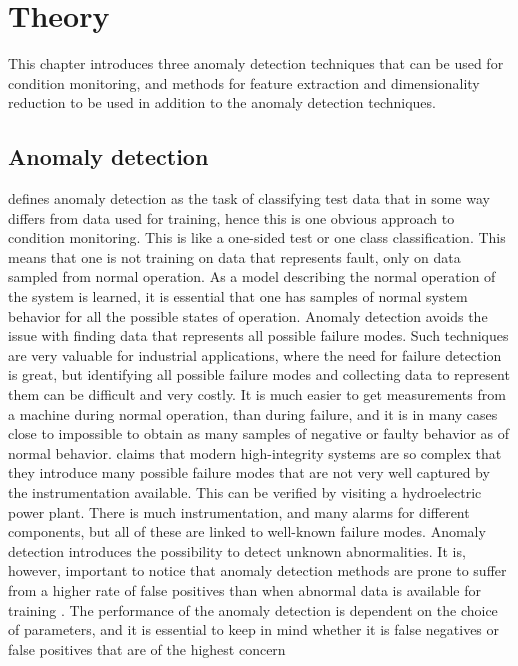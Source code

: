 \chapter{Theory}\label{cha:litterature}

This chapter introduces three anomaly detection techniques that can be used for condition monitoring, and methods for feature extraction and dimensionality reduction to be used in addition to the anomaly detection techniques. 


\section{Anomaly detection}\label{sec:novelty_detection}
    \cite{Pimentel2014} defines anomaly detection as the task of classifying test data that in some way differs from data used for training, hence this is one obvious approach to condition monitoring. This is like a one-sided test or one class classification. This means that one is not training on data that represents fault, only on data sampled from normal operation. As a model describing the normal operation of the system is learned, it is essential that one has samples of normal system behavior for all the possible states of operation. Anomaly detection avoids the issue with finding data that represents all possible failure modes. Such techniques are very valuable for industrial applications, where the need for failure detection is great, but identifying all possible failure modes and collecting data to represent them can be difficult and very costly. It is much easier to get measurements from a machine during normal operation, than during failure, and it is in many cases close to impossible to obtain as many samples of negative or faulty behavior as of normal behavior. \cite{Tarassenko2009} claims that modern high-integrity systems are so complex that they introduce many possible failure modes that are not very well captured by the instrumentation available. This can be verified by visiting a hydroelectric power plant. There is much instrumentation, and many alarms for different components, but all of these are linked to well-known failure modes. Anomaly detection introduces the possibility to detect unknown abnormalities. It is, however, important to notice that anomaly detection methods are prone to suffer from a higher rate of false positives than when abnormal data is available for training \cite{Latecki}. The performance of the anomaly detection is dependent on the choice of parameters, and it is essential to keep in mind whether it is false negatives or false positives that are of the highest concern 
    
